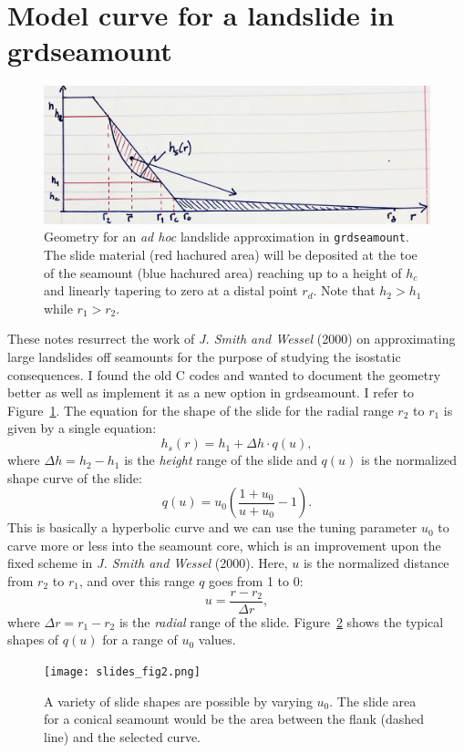 \documentclass[12pt,letterpaper,margin=0.5in]{report}
\begin{document}
\section{Model curve for a landslide in grdseamount}

\begin{figure}[h!]
  \centering
  \includegraphics[width=5in]{slides_fig1.png}
  \caption{Geometry for an \emph{ad hoc} landslide approximation in \texttt{grdseamount}.  The slide material (red hachured area)
  will be deposited at the toe of the seamount (blue hachured area) reaching up to a height of $h_c$ and linearly
  tapering to zero at a distal point $r_d$. Note that $h_2 > h_1$ while $r_1 > r_2$.}
  \label{slides_fig1}
\end{figure}

These notes resurrect the work of {\it J. Smith and Wessel} (2000) on approximating large landslides off seamounts
for the purpose of studying the isostatic consequences.  I found the old C codes and wanted to document the geometry
better as well as implement it as a new option in grdseamount.  I refer to Figure~\ref{slides_fig1}.  The equation for the
shape of the slide for the radial range $r_2$ to $r_1$ is given by a single equation:
\begin{equation}
h_s(r) = h_1 + \Delta h \cdot q(u),
\end{equation}
where $\Delta h = h_2 - h_1$ is the \emph{height} range of the slide and $q(u)$ is the normalized shape curve of the slide:
\begin{equation}
q(u) = u_0 \left (\frac{1 + u_0}{u + u_0} - 1 \right ).
\end{equation}
This is basically a hyperbolic curve and we can use the tuning parameter $u_0$ to carve more or less into the seamount core,
which is an improvement upon the fixed scheme in {\it J. Smith and Wessel} (2000).
Here, $u$ is the normalized distance from $r_2$ to $r_1$, and over this range $q$ goes from 1 to 0:
\begin{equation}
u = \frac{r-r_2}{\Delta r},
\end{equation}
where $\Delta r = r_1 - r_2$ is the \emph{radial} range of the slide.
Figure~\ref{slides_fig2} shows the typical shapes of $q(u)$ for a range of $u_0$ values.
\begin{figure}[h!]
  \centering
  \texttt{[image: slides\_fig2.png]}
  \caption{A variety of slide shapes are possible by varying $u_0$.  The slide area for a conical seamount would be the area
  between the flank (dashed line) and the selected curve.}
  \label{slides_fig2}
\end{figure}
\end{document}
